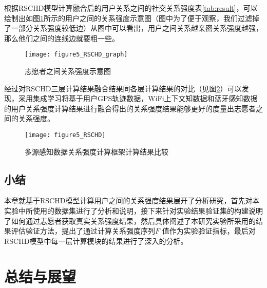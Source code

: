 \par 根据RSCHD模型计算融合后的用户关系之间的社交关系强度表\ref{tab:result}，可以绘制出如图\ref{fig:RSCHD_graph}所示的用户之间的关系强度示意图（图中为了便于观察，我们过滤掉了一部分关系强度较低边）从图中可以看出，用户之间关系越亲密关系强度越强，那么他们之间的连线边就要粗一些。

\begin{figure}[htb]
\centering
\texttt{[image: figure5\_RSCHD\_graph]}
\caption{志愿者之间关系强度示意图}
\label{fig:RSCHD_graph}
\end{figure}

\par 经过对RSCHD三层计算结果融合结果同各层计算结果的对比（见图\ref{fig:result_RSCHD}）可以发现，采用集成学习将基于用户GPS轨迹数据，WiFi上下文知数据和蓝牙感知数据的用户关系强度计算结果进行融合得出的关系强度结果能够更好的度量出志愿者之间的关系强度。
\begin{figure}[htb]
\centering
\texttt{[image: figure5\_RSCHD]}
\caption{多源感知数据关系强度计算框架计算结果比较}
\label{fig:result_RSCHD}
\end{figure}
\newpage
\section{小结}
\label{sec:section5-4}
本章就基于RSCHD模型计算用户之间的关系强度结果展开了分析研究，首先对本实验中所使用的数据集进行了分析和说明，接下来针对实验结果验证集的构建说明了如何通过志愿者获取真实关系强度结果，然后具体阐述了本研究实验所采用的结果评估验证方法，提出了通过计算关系强度序列$F$ 值作为实验验证指标，最后对RSCHD模型中每一层计算模块的结果进行了深入的分析。
\chapter{总结与展望}
\label{chap:chapter06}
